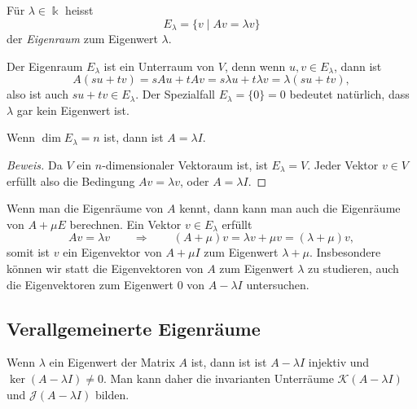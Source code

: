 \begin{definition}
Für $\lambda\in\Bbbk$ heisst
\[
E_\lambda
=
\{ v\;|\; Av=\lambda v\}
\]
der {\em Eigenraum} zum Eigenwert $\lambda$.
%
\end{definition}

Der Eigenraum $E_\lambda$ ist ein Unterraum von $V$, denn wenn
$u,v\in E_\lambda$, dann ist
\[
A(su+tv)
=
sAu+tAv
=
s\lambda u + t\lambda v
=
\lambda(su+tv),
\]
also ist auch $su+tv\in E_\lambda$.
Der Spezialfall $E_\lambda = \{0\}=0$ bedeutet natürlich, dass $\lambda$ gar kein
Eigenwert ist.

\begin{satz}
Wenn $\dim E_\lambda=n$ ist, dann ist $A=\lambda I$.
\end{satz}

\begin{proof}[Beweis]
Da $V$ ein $n$-dimensionaler Vektoraum ist, ist $E_\lambda=V$.
Jeder Vektor $v\in V$ erfüllt also die Bedingung $Av=\lambda v$,
oder $A=\lambda I$.
\end{proof}

Wenn man die Eigenräume von $A$ kennt, dann kann man auch die Eigenräume
von $A+\mu E$ berechnen.
Ein Vektor $v\in E_\lambda$ erfüllt
\[
Av=\lambda v
\qquad\Rightarrow\qquad
(A+\mu)v = \lambda v + \mu v
=
(\lambda+\mu)v,
\]
somit ist $v$ ein Eigenvektor von $A+\mu I$ zum Eigenwert $\lambda+\mu$.
Insbesondere können wir statt die Eigenvektoren von $A$ zum Eigenwert $\lambda$
zu studieren, auch die Eigenvektoren zum Eigenwert $0$ von $A-\lambda I$
untersuchen.

%
%
\subsection{Verallgemeinerte Eigenräume
\label{buch:subsection:verallgemeinerte-eigenraeume}}
Wenn $\lambda$ ein Eigenwert der Matrix $A$ ist, dann ist
ist $A-\lambda I$ injektiv und $\ker(A-\lambda I)\ne 0$.
Man kann daher die invarianten Unterräume $\mathcal{K}(A-\lambda I)$
und $\mathcal{J}(A-\lambda I)$ bilden.


